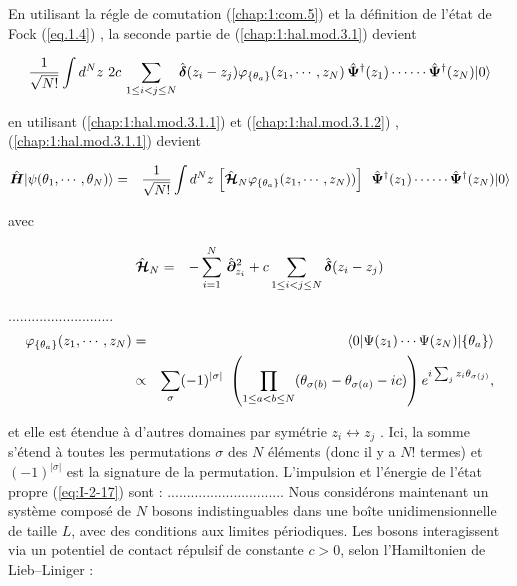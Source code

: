 En utilisant la régle de comutation (\ref{chap:1:com.5}) et la définition de l'état de Fock (\ref{eq.1.4}) , la seconde partie de (\ref{chap:1:hal.mod.3.1}) devient

\begin{eqnarray}
	 \frac{1}{ \sqrt{N!}} \int d^N z \,  \,2c \,\sum_{1\leq i<j\leq N} \hat{\bm{\delta}}(z_i - z_j) \varphi_{\{\theta_a\}}(z_1, \cdots ,  z_N) \, \hat{\bm{\Psi}}^\dag(z_1) \cdots  \cdots\hat{\bm{\Psi}}^\dag(z_N) \vert 0 \rangle \label{chap:1:hal.mod.3.1.2}	
\end{eqnarray} 

en utilisant (\ref{chap:1:hal.mod.3.1.1}) et (\ref{chap:1:hal.mod.3.1.2}) , (\ref{chap:1:hal.mod.3.1.1}) devient 

\begin{eqnarray}
	\operator{H}\vert \psi ( \theta_1 , \cdots , \theta_N ) \rangle &= &  \frac{1}{ \sqrt{N!}} \int d^N z \,  	\left [ \operator{\mathcal{H}}_N \varphi_{\{\theta_a\}}(z_1, \cdots ,  z_N)) \right ] \, \operator{\Psi}^\dag(z_1) \cdots  \cdots\operator{\Psi}^\dag(z_N) \vert 0 \rangle		
\end{eqnarray}

avec 

\begin{eqnarray}
	\hat{\bm{\mathcal{H}}}_N & = &  - \sum_{i=1}^N \, \hat{\bm{\partial}}_{z_i}^2 + 	c \sum_{1\leq i<j\leq N} \hat{\bm{\delta}}(z_i - z_j) 		
\end{eqnarray}


...........................
\begin{eqnarray}
	\varphi_{\{\theta_a\}} ( z_1 , \cdots , z_N ) & = & \langle 0 \vert \Psi ( z_1 ) \cdots \Psi (z_N ) \vert \{ \theta_a \} \rangle \notag\\
	& \propto & \sum_\sigma ( - 1 ) ^{ \vert \sigma \vert } \left ( \prod_{ 1 \leq a < b \leq N } ( \theta_{\sigma(b)} - \theta_{\sigma(a)} - ic ) \right ) e^{i \sum_j z_i \theta_{ \sigma(j)}}\label{eq:I-2-17},
\end{eqnarray}

et elle est étendue à d'autres domaines par symétrie $z_i \leftrightarrow z_j$ . Ici, la somme s'étend à toutes les permutations $\sigma$ des $N$ éléments (donc il y a $N!$ termes) et $(-1)^{|\sigma|}$ est la signature de la permutation. L'impulsion et l'énergie de l'état propre (\ref{eq:I-2-17}) sont :
..............................
Nous considérons maintenant un système composé de \(N\) bosons indistinguables dans une boîte unidimensionnelle de taille \(L\), avec des conditions aux limites périodiques. Les bosons interagissent via un potentiel de contact répulsif de constante \(c > 0\), selon l’Hamiltonien de Lieb–Liniger :

